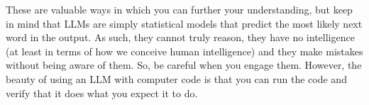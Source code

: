 These are valuable ways in which you can further your understanding, but keep in mind that LLMs are simply statistical models that predict the most likely next word in the output. As such, they cannot truly reason, they have no intelligence (at least in terms of how we conceive human intelligence) and they make mistakes without being aware of them. So, be careful when you engage them. However, the beauty of using an LLM with computer code is that you can run the code and verify that it does what you expect it to do. 
